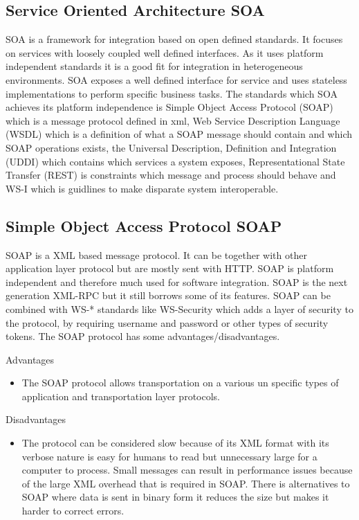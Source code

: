 \documentclass{llncs}
\begin{document}
\subsection{Service Oriented Architecture SOA}
SOA is a framework for integration based on open defined standards. It focuses on services with  loosely coupled well defined interfaces. As it uses platform independent standards it is a good fit for integration in heterogeneous environments. SOA exposes a well defined interface for service and uses stateless implementations to perform specific business tasks. The standards which SOA achieves its platform independence is Simple Object Access Protocol (SOAP) which is a message protocol defined in xml, Web Service Description Language (WSDL) which is a definition of what a SOAP message should contain and which SOAP operations exists, the Universal Description, Definition and Integration (UDDI) which contains which services a system exposes, Representational State Transfer (REST) is constraints which message and process should behave and WS-I which is guidlines to make disparate system interoperable.

\subsection{Simple Object Access Protocol SOAP}
SOAP is a XML based message protocol. It can be together with other application layer protocol but are mostly sent with HTTP. SOAP is platform independent and therefore much used for software  integration. SOAP is the next generation XML-RPC but it still borrows some of its features. SOAP can be combined with WS-* standards like WS-Security which adds a layer of security to the protocol, by requiring username and password or other types of security tokens. The SOAP protocol has some advantages/disadvantages.

Advantages
\begin{itemize}
\item The SOAP protocol allows transportation on a various un specific types of application and transportation layer protocols.
\end{itemize}
Disadvantages
\begin{itemize}
\item The protocol can be considered slow because of its XML format with its verbose nature is easy for humans to read but unnecessary large for a computer to process. Small messages can result in performance issues because of the large XML overhead that is required in SOAP. There is alternatives to SOAP where data is sent in binary form it reduces the size but makes it harder to correct errors.
\end{itemize}
\end{document}
